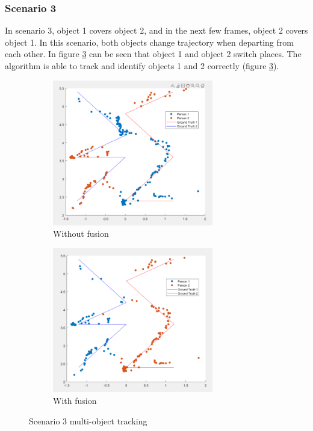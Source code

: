 \subsubsection{Scenario 3}\label{sec:3-exp_result3}
In scenario 3, object 1 covers object 2, and in the next few frames, object 2 covers object 1.
In this scenario, both objects change trajectory when departing from each other.
In figure \ref*{fig:scenario_result_3} can be seen that object 1 and object 2 switch places.
The algorithm is able to track and identify objects 1 and 2 correctly (figure \ref*{fig:scenario_result_3}).
\begin{figure}[hbpt]
    \centering
    \begin{subfigure}{0.3\linewidth}
        \includegraphics[width=7cm]{Figures/3_before.png}
        \caption{Without fusion}
        \label{subfig:without_fusion_3}
    \end{subfigure}
    \hspace{0.15\textwidth}
    \begin{subfigure}{0.3\linewidth}
        \includegraphics[width=7cm]{Figures/3_after.png}
        \caption{With fusion}
        \label{subfig:with_fusion_3}
    \end{subfigure}

    \caption{Scenario 3 multi-object tracking}
    \label{fig:scenario_result_3}
\end{figure}